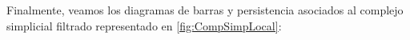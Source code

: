 \documentclass[12pt, a4paper, twoside]{book}
\numberwithin{equation}{section}
\theoremstyle{definition}
\newenvironment{ejem}
  {\pushQED{\qed}\renewcommand{\qedsymbol}{$\blacktriangleleft$}\ejemplo}
  {\popQED\endejemplo}
\theoremstyle{remark}
\theoremstyle{plain}
\begin{document}
\begin{ejem}
	Finalmente, veamos los diagramas de barras y persistencia asociados al
	complejo simplicial filtrado representado en \ref{fig:CompSimpLocal}:
	\begin{figure}[H]
			\begin{figure}[H]
			\end{figure}
		\endminipage
			\begin{figure}[H]

\end{figure}
\end{figure}
\end{ejem}
\end{document}
